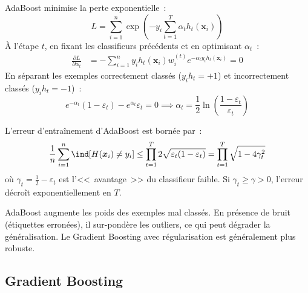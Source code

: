 \begin{theoreme}
AdaBoost minimise la perte exponentielle~:
\begin{equation}
  L = \sum_{i=1}^n \exp\!\left(-y_i \sum_{t=1}^T \alpha_t h_t(\bm{x}_i)\right)
\end{equation}
\`A l'\'etape $t$, en fixant les classifieurs pr\'ec\'edents et en optimisant
$\alpha_t$~:
\begin{align}
  \frac{\partial L}{\partial \alpha_t}
  &= -\sum_{i=1}^n y_i h_t(\bm{x}_i) w_i^{(t)} e^{-\alpha_t y_i h_t(\bm{x}_i)}
  = 0
\end{align}
En s\'eparant les exemples correctement class\'es ($y_i h_t = +1$) et
incorrectement class\'es ($y_i h_t = -1$)~:
\begin{equation}
  e^{-\alpha_t}(1 - \varepsilon_t) - e^{\alpha_t}\varepsilon_t = 0
  \implies \alpha_t = \frac{1}{2}\ln\!\left(\frac{1 - \varepsilon_t}
  {\varepsilon_t}\right)
\end{equation}
\end{theoreme}

\begin{proposition}
L'erreur d'entra\^inement d'AdaBoost est born\'ee par~:
\begin{equation}
  \frac{1}{n}\sum_{i=1}^n \ind[H(\bm{x}_i) \neq y_i]
  \leq \prod_{t=1}^T 2\sqrt{\varepsilon_t(1 - \varepsilon_t)}
  = \prod_{t=1}^T \sqrt{1 - 4\gamma_t^2}
\end{equation}
o\`u $\gamma_t = \frac{1}{2} - \varepsilon_t$ est l'<<~avantage~>> du
classifieur faible. Si $\gamma_t \geq \gamma > 0$, l'erreur
d\'ecro\^it exponentiellement en $T$.
\end{proposition}

\begin{attention}[title=\textbf{AdaBoost et le bruit}]
AdaBoost augmente les poids des exemples mal class\'es. En pr\'esence de bruit
(\'etiquettes erron\'ees), il sur-pond\`ere les outliers, ce qui peut
d\'egrader la g\'en\'eralisation. Le Gradient Boosting avec r\'egularisation
est g\'en\'eralement plus robuste.
\end{attention}

\subsection{Gradient Boosting}

